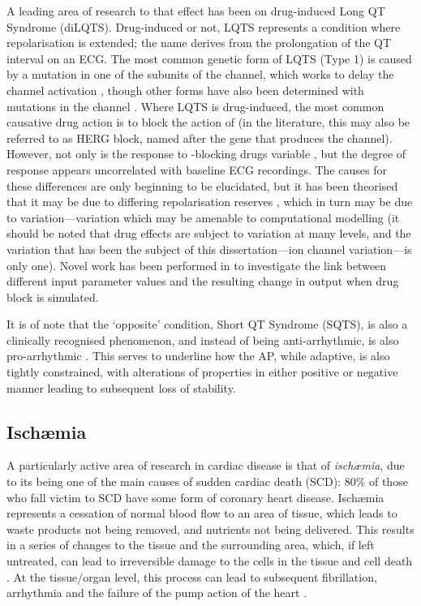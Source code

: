 \documentclass[../thesis-main.tex]{subfiles}
\begin{document}
A leading area of research to that effect has been on drug-induced Long QT Syndrome (diLQTS). Drug-induced or not, LQTS represents a condition where repolarisation is extended; the name derives from the prolongation of the QT interval on an ECG. The most common genetic form of LQTS (Type 1) is caused by a mutation in one of the subunits of the \iks{} channel, which works to delay the channel activation \citep{Jons2011, Hoefen2012, Jou2013}, though other forms have also been determined with mutations in the \ina{} channel \citep{Hashambhoy2011}. Where LQTS is drug-induced, the most common causative drug action is to block the action of \ikr{} (in the literature, this may also be referred to as HERG block, named after the gene that produces the channel). However, not only is the response to \ikr{}-blocking drugs variable \citep{Kannankeril2010}, but the degree of response appears uncorrelated with baseline ECG recordings. The causes for these differences are only beginning to be elucidated, but it has been theorised that it may be due to differing repolarisation reserves \citep{Varro2011}, which in turn may be due to variation---variation which may be amenable to computational modelling (it should be noted that drug effects are subject to variation at many levels, and the variation that has been the subject of this dissertation---ion channel variation---is only one). Novel work has been performed in \citet{Sarkar2011} to investigate the link between different input parameter values and the resulting change in output when drug block is simulated.

It is of note that the `opposite' condition, Short QT Syndrome (SQTS), is also a clinically recognised phenomenon, and instead of being anti-arrhythmic, is also pro-arrhythmic \citep{Adeniran2011}. This serves to underline how the AP, while adaptive, is also tightly constrained, with alterations of properties in either positive or negative manner leading to subsequent loss of stability.

\subsection{Isch\ae{}mia}
\label{subsec:ischaemia}
A particularly active area of research in cardiac disease is that of \emph{isch\ae{}mia}, due to its being one of the main causes of sudden cardiac death (SCD): $80\%$ of those who fall victim to SCD have some form of coronary heart disease. Isch\ae{}mia represents a cessation of normal blood flow to an area of tissue, which leads to waste products not being removed, and nutrients not being delivered. This results in a series of changes to the tissue and the surrounding area, which, if left untreated, can lead to irreversible damage to the cells in the tissue and cell death \citep{Carmeliet1999}. At the tissue/organ level, this process can lead to subsequent fibrillation, arrhythmia and the failure of the pump action of the heart \citep{Harris1954}.
\end{document}
